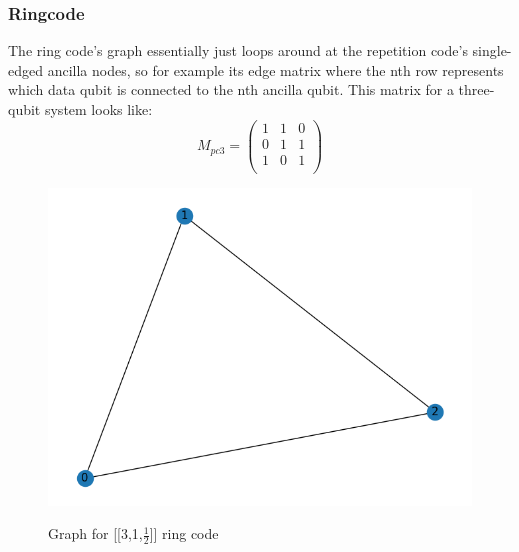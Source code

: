\subsubsection{Ringcode}
The ring code's graph essentially just loops around at the repetition
code's single-edged ancilla nodes, so for example its edge matrix where the nth row
represents which data qubit is connected to the nth ancilla
qubit.
This matrix for a three-qubit system looks like:
\begin{equation}
    M_{pc3} = \left(
        \begin{array}{ccc}
            1 & 1 & 0\\
            0 & 1 & 1\\
            1 & 0 & 1\\
        \end{array}
        \right)
\end{equation}

\begin{figure}[h!]
	\begin{center}
	\captionsetup{justification=centering,margin=2cm}
	\includegraphics[scale=0.4]{./img/figures/ring_3_graph.png}\\
	\caption{Graph for [[3,1,$\frac{1}{2}$]] ring code}
        
	\label{fig: ring_graph}
	\end{center}
\end{figure}
